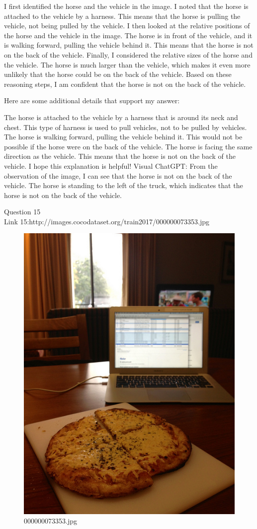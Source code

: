 \begin{enumerate}
        I first identified the horse and the vehicle in the image.
        I noted that the horse is attached to the vehicle by a harness. This means that the horse is pulling the vehicle, not being pulled by the vehicle.
        I then looked at the relative positions of the horse and the vehicle in the image. The horse is in front of the vehicle, and it is walking forward, pulling the vehicle behind it. This means that the horse is not on the back of the vehicle.
        Finally, I considered the relative sizes of the horse and the vehicle. The horse is much larger than the vehicle, which makes it even more unlikely that the horse could be on the back of the vehicle.
        Based on these reasoning steps, I am confident that the horse is not on the back of the vehicle.

        Here are some additional details that support my answer:

        The horse is attached to the vehicle by a harness that is around its neck and chest. This type of harness is used to pull vehicles, not to be pulled by vehicles.
        The horse is walking forward, pulling the vehicle behind it. This would not be possible if the horse were on the back of the vehicle.
        The horse is facing the same direction as the vehicle. This means that the horse is not on the back of the vehicle.
        I hope this explanation is helpful!
        \subitem Visual ChatGPT: From the observation of the image, I can see that the horse is not on the back of the vehicle. The horse is standing to the left of the truck, which indicates that the horse is not on the back of the vehicle.
    \end{enumerate}
Question 15\\
Link 15:http://images.cocodataset.org/train2017/000000073353.jpg
    \begin{figure}[h]
        \centering
        \includegraphics[width=0.8\linewidth]{../image set/easy/000000073353.jpg}
        \caption{000000073353.jpg}
    \end{figure}
